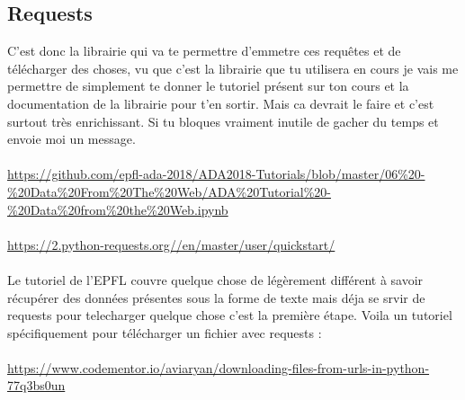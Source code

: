 \documentclass[10pt,a4paper]{book}
\begin{document}
\subsection{Requests}
C'est donc la librairie qui va te permettre d'emmetre ces requêtes et de télécharger des choses, vu que c'est la librairie que tu utilisera en cours je vais me permettre de simplement te donner le tutoriel présent sur ton cours et la documentation de la librairie pour t'en sortir. Mais ca devrait le faire et c'est surtout très enrichissant. Si tu bloques vraiment inutile de gacher du temps et envoie moi un message.
\\\\
\url{https://github.com/epfl-ada-2018/ADA2018-Tutorials/blob/master/06%20-%20Data%20From%20The%20Web/ADA%20Tutorial%20-%20Data%20from%20the%20Web.ipynb}
\\\\
\url{https://2.python-requests.org//en/master/user/quickstart/} 
\\\\
Le tutoriel de l'EPFL couvre quelque chose de légèrement différent à savoir récupérer des données présentes sous la forme de texte mais déja se srvir de requests pour telecharger quelque chose c'est la première étape. 
Voila un tutoriel spécifiquement pour télécharger un fichier avec requests :
\\\\
\url{https://www.codementor.io/aviaryan/downloading-files-from-urls-in-python-77q3bs0un}
\\
\end{document}

